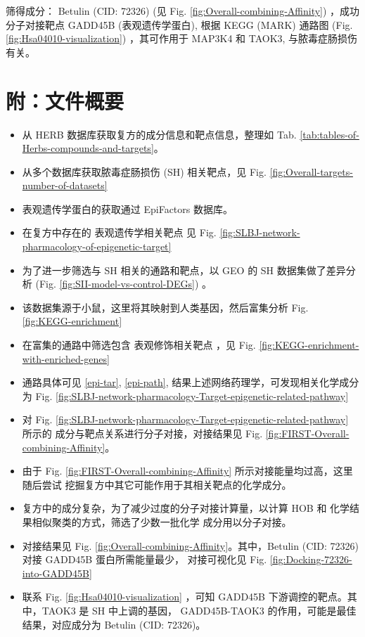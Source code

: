 \documentclass[
]{article}
\providecommand{\tightlist}{%
  \setlength{\itemsep}{0pt}\setlength{\parskip}{0pt}}
\begin{document}
筛得成分： Betulin (CID: 72326) (见 Fig. \ref{fig:Overall-combining-Affinity}) ，成功分子对接靶点 GADD45B (表观遗传学蛋白),
根据 KEGG (MARK) 通路图 (Fig. \ref{fig:Hsa04010-visualization}) ，其可作用于 MAP3K4 和 TAOK3, 与脓毒症肠损伤有关。

\hypertarget{ux9644ux6587ux4ef6ux6982ux8981}{%
\section{附：文件概要}\label{ux9644ux6587ux4ef6ux6982ux8981}}

\begin{itemize}
\tightlist
\item
  从 HERB 数据库获取复方的成分信息和靶点信息，整理如 Tab. \ref{tab:tables-of-Herbs-compounds-and-targets}。
\item
  从多个数据库获取脓毒症肠损伤 (SH) 相关靶点，见 Fig. \ref{fig:Overall-targets-number-of-datasets}
\item
  表观遗传学蛋白的获取通过 EpiFactors 数据库。
\item
  在复方中存在的 表观遗传学相关靶点 见 Fig. \ref{fig:SLBJ-network-pharmacology-of-epigenetic-target}
\item
  为了进一步筛选与 SH 相关的通路和靶点，以 GEO 的 SH 数据集做了差异分析 (Fig. \ref{fig:SII-model-vs-control-DEGs}) 。
\item
  该数据集源于小鼠，这里将其映射到人类基因，然后富集分析 Fig. \ref{fig:KEGG-enrichment}
\item
  在富集的通路中筛选包含 表观修饰相关靶点 ，见 Fig. \ref{fig:KEGG-enrichment-with-enriched-genes}
\item
  通路具体可见 \ref{epi-tar}, \ref{epi-path}, 结果上述网络药理学，可发现相关化学成分为
  Fig. \ref{fig:SLBJ-network-pharmacology-Target-epigenetic-related-pathway}
\item
  对 Fig. \ref{fig:SLBJ-network-pharmacology-Target-epigenetic-related-pathway} 所示的
  成分与靶点关系进行分子对接，对接结果见 Fig. \ref{fig:FIRST-Overall-combining-Affinity}。
\item
  由于 Fig. \ref{fig:FIRST-Overall-combining-Affinity} 所示对接能量均过高，这里随后尝试
  挖掘复方中其它可能作用于其相关靶点的化学成分。
\item
  复方中的成分复杂，为了减少过度的分子对接计算量，以计算 HOB 和 化学结果相似聚类的方式，筛选了少数一批化学
  成分用以分子对接。
\item
  对接结果见 Fig. \ref{fig:Overall-combining-Affinity}。其中，Betulin (CID: 72326) 对接 GADD45B 蛋白所需能量最少，
  对接可视化见 Fig. \ref{fig:Docking-72326-into-GADD45B}
\item
  联系 Fig. \ref{fig:Hsa04010-visualization} ，可知 GADD45B 下游调控的靶点。其中，TAOK3 是 SH 中上调的基因，
  GADD45B-TAOK3 的作用，可能是最佳结果，对应成分为 Betulin (CID: 72326)。
\end{itemize}
\end{document}
